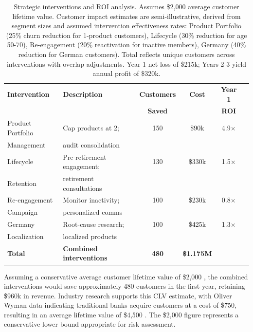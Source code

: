 \documentclass[12pt]{article}
\begin{document}
\begin{table}[H]
\centering
\small
\caption{Strategic interventions and ROI analysis. Assumes \$2,000 average customer lifetime value. Customer impact estimates are semi-illustrative, derived from segment sizes and assumed intervention effectiveness rates: Product Portfolio (25\% churn reduction for 1-product customers), Lifecycle (30\% reduction for age 50-70), Re-engagement (20\% reactivation for inactive members), Germany (40\% reduction for German customers). Total reflects unique customers across interventions with overlap adjustments. Year 1 net loss of \$215k; Years 2-3 yield annual profit of \$320k.}
\label{tab:roi_analysis}
\begin{tabular}{lp{5.5cm}cccc}
\toprule
\textbf{Intervention} & \textbf{Description} & \textbf{Customers} & \textbf{Cost} & \textbf{Year 1} \\
& & \textbf{Saved} & & \textbf{ROI} \\
\midrule
Product Portfolio & Cap products at 2; & 150 & \$90k & 4.9× \\
Management & audit consolidation & & & \\
\midrule
Lifecycle & Pre-retirement engagement; & 130 & \$330k & 1.5× \\
Retention & retirement consultations & & & \\
\midrule
Re-engagement & Monitor inactivity; & 100 & \$230k & 0.8× \\
Campaign & personalized comms & & & \\
\midrule
Germany & Root-cause research; & 100 & \$425k & 1.3× \\
Localization & localized products & & & \\
\midrule
\textbf{Total} & \textbf{Combined interventions} & \textbf{480} & \textbf{\$1.175M} & \\
\bottomrule
\end{tabular}
\end{table}

Assuming a conservative average customer lifetime value of \$2,000 \citep{meleis2010clv}, the combined interventions would save approximately 480 customers in the first year, retaining \$960k in revenue.  Industry research supports this CLV estimate, with Oliver Wyman data indicating traditional banks acquire customers at a cost of \$750, resulting in an average lifetime value of \$4,500 \citep{chowdhry2019chime}.  The \$2,000 figure represents a conservative lower bound appropriate for risk assessment.
\end{document}
